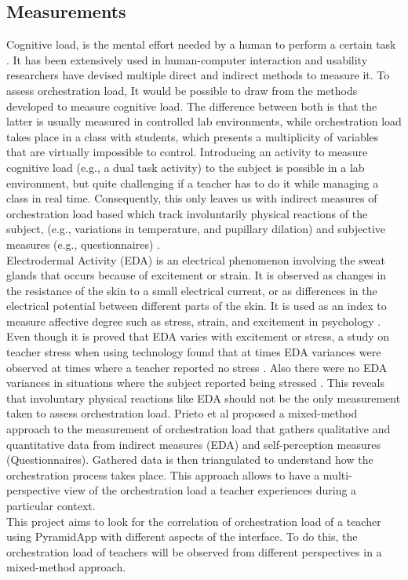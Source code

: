 \subsection{Measurements}
Cognitive load, is the mental effort needed by a human to perform a certain task \cite{Wang2005-nv}. It has been extensively used in human-computer interaction and usability researchers have devised multiple direct and indirect methods to measure it. To assess orchestration load, It would be possible to draw from the methods developed to measure cognitive load. The difference between both is that the latter is usually measured in controlled lab environments, while orchestration load takes place in a class with students, which presents a multiplicity of variables that are virtually impossible to control. Introducing an activity to measure cognitive load (e.g., a dual task activity) to the subject is possible in a lab environment, but quite challenging if a teacher has to do it while managing a class in real time. Consequently, this only leaves us with indirect measures of orchestration load based which track involuntarily physical reactions of the subject, (e.g., variations in temperature, and pupillary dilation) and subjective measures (e.g., questionnaires) \cite{Prieto2018-vw}.\\
Electrodermal Activity (EDA) is an electrical phenomenon involving the sweat glands that occurs because of excitement or strain. It is observed as changes in the resistance of the skin to a small electrical current, or as differences in the electrical potential between different parts of the skin. It is used as an index to measure affective degree such as stress, strain, and excitement in psychology \cite{Kurniawan2013-ti}.\\
Even though it is proved that EDA varies with excitement or stress, a study on teacher stress when using technology found that at times EDA variances were observed at times where a teacher reported no stress \cite{Nepal_Ojashwi_and_Rk_Jha_and_Bk_Kapoor_undated-ni}. Also there were no EDA variances in situations where the subject reported being stressed \cite{Al-Fudail2008-zo}. This reveals that involuntary physical reactions like EDA should not be the only measurement taken to assess orchestration load. 
Prieto et al proposed a mixed-method approach to the measurement of orchestration load \cite{Prieto2015-gd} that gathers qualitative and quantitative data from indirect measures (EDA) and self-perception measures (Questionnaires). Gathered data is then triangulated to understand how the orchestration process takes place. This approach allows to have a multi-perspective view of the orchestration load a teacher experiences during a particular context.\\
This project aims to look for the correlation of orchestration load of a teacher using PyramidApp with different aspects of the interface. To do this, the orchestration load of teachers will be observed from different perspectives in a mixed-method approach.
